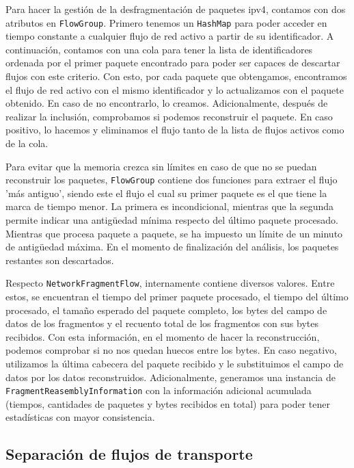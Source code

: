 Para hacer la gestión de la desfragmentación de paquetes \acrshort{ipv4}, contamos con dos atributos en \texttt{FlowGroup}. Primero tenemos un \texttt{HashMap} para poder acceder en tiempo constante a cualquier flujo de red activo a partir de su identificador. A continuación, contamos con una cola para tener la lista de identificadores ordenada por el primer paquete encontrado para poder ser capaces de descartar flujos con este criterio. Con esto, por cada paquete que obtengamos, encontramos el flujo de red activo con el mismo identificador y lo actualizamos con el paquete obtenido. En caso de no encontrarlo, lo creamos. Adicionalmente, después de realizar la inclusión, comprobamos si podemos reconstruir el paquete. En caso positivo, lo hacemos y eliminamos el flujo tanto de la lista de flujos activos como de la cola.

Para evitar que la memoria crezca sin límites en caso de que no se puedan reconstruir los paquetes, \texttt{FlowGroup} contiene dos funciones para extraer el flujo 'más antiguo', siendo este el flujo el cual su primer paquete es el que tiene la marca de tiempo menor. La primera es incondicional, mientras que la segunda permite indicar una antigüedad mínima respecto del último paquete procesado. Mientras que procesa paquete a paquete, se ha impuesto un límite de un minuto de antigüedad máxima. En el momento de finalización del análisis, los paquetes restantes son descartados. 

Respecto \texttt{NetworkFragmentFlow}, internamente contiene diversos valores. Entre estos, se encuentran el tiempo del primer paquete procesado, el tiempo del último procesado, el tamaño esperado del paquete completo, los bytes del campo de datos de los fragmentos y el recuento total de los fragmentos con sus bytes recibidos. Con esta información, en el momento de hacer la reconstrucción, podemos comprobar si no nos quedan huecos entre los bytes. En caso negativo, utilizamos la última cabecera del paquete recibido y le substituimos el campo de datos por los datos reconstruidos. Adicionalmente, generamos una instancia de \texttt{FragmentReasemblyInformation} con la información adicional acumulada (tiempos, cantidades de paquetes y bytes recibidos en total) para poder tener estadísticas con mayor consistencia.

\subsection{Separación de flujos de transporte} \label{flowseparation}

